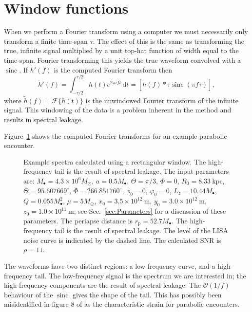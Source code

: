 \documentclass[useAMS,usedcolumn,usegraphicx,usenatbib]{mn2e}
\newcommand{\Figref}[1]{Figure~\ref{fig:#1}}
\newcommand{\secref}[1]{Sec.~\ref{sec:#1}}
\newcommand{\units}[1]{\ensuremath{~\mathrm{#1}}}
\DeclareMathOperator{\sinc}{sinc}
\newcommand{\sub}[1]{\ensuremath{_\mathrm{#1}}}
\newcommand{\dd}{\ensuremath{\mathrm{d}}}
\newcommand{\intd}[4]{\ensuremath{\int_{#1}^{#2}{#3}\,\dd{#4}}}
\newcommand{\order}[1]{\ensuremath{\mathcal{O}({#1})}}
\begin{document}
{\appendix

\section{Window functions}\label{ap:window}

When we perform a Fourier transform using a computer we must necessarily only transform a finite time-span $\tau$. The effect of this is the same as transforming the true, infinite signal multiplied by a unit top-hat function of width equal to the time-span. Fourier transforming this yields the true waveform convolved with a $\sinc$. If $\tilde{h}'(f)$ is the computed Fourier transform then
\begin{equation}
\tilde{h}'(f) = \intd{-\tau/2}{\tau/2}{h(t)e^{2\pi i ft}}{t} = \left[\tilde{h}(f) \ast \tau \sinc(\pi f\tau)\right],
\end{equation}
where $\tilde{h}(f) = \mathscr{F}\{h(t)\}$ is the unwindowed Fourier transform of the infinite signal. This windowing of the data is a problem inherent in the method and results in spectral leakage.

\Figref{Rectangular} shows the computed Fourier transforms for an example parabolic encounter.
\begin{figure}[htbp]
  \begin{center} 
    \caption{Example spectra calculated using a rectangular window.  The high-frequency tail is the result of spectral leakage. The input parameters are: $M_\bullet = 4.3 \times 10^6 M_\odot$, $a = 0.5 M_\bullet$, $\Theta = \pi/3$, $\Phi = 0$, $R_0 = 8.33\units{kpc}$, $\overline{\Theta} = {95.607669}^{\circ}$, $\overline{\Phi} = {266.851760}^{\circ}$, $\overline{\phi}_0 = 0$, $\varphi_0 = 0$, $L_z = 10.44 M_\bullet$, $Q = 0.055 M_\bullet^2$, $\mu = 5 M_\odot$, $x_0 = 3.5 \times 10^{12}\units{m}$, $y_0 = 3.0 \times 10^{12}\units{m}$, $z_0 = 1.0 \times 10^{11}\units{m}$; see \secref{Parameters} for a discussion of these parameters. The periapse distance is $r\sub{p} = 52.7 M_\bullet$. The high-frequency tail is the result of spectral leakage. The level of the LISA noise curve is indicated by the dashed line. The calculated SNR is $\rho = 11$.}
    \label{fig:Rectangular}
  \end{center}
\end{figure}
The waveforms have two distinct regions: a low-frequency curve, and a high-frequency tail. The low-frequency signal is the spectrum we are interested in; the high-frequency components are the result of spectral leakage. The $\order{1/{f}}$ behaviour of the $\sinc$ gives the shape of the tail. This has possibly been misidentified in figure 8 of \citet{Burko2007} as the characteristic strain for parabolic encounters.

}
\end{document}
